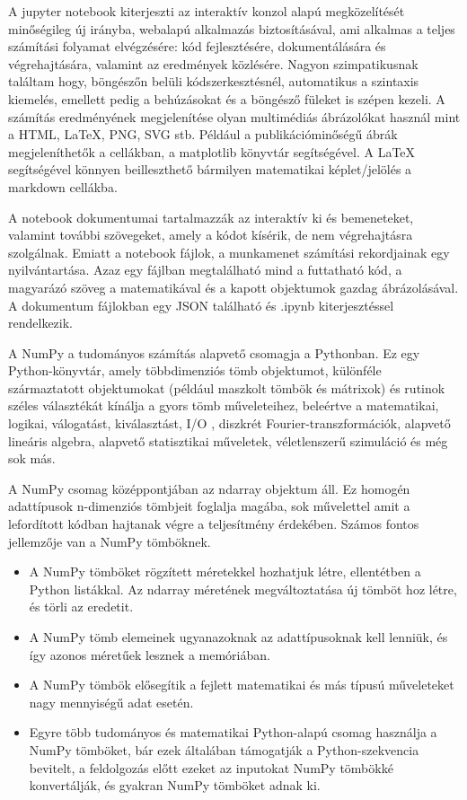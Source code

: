 
A jupyter notebook kiterjeszti az interaktív konzol alapú megközelítését minőségileg új irányba, webalapú alkalmazás biztosításával, ami alkalmas a teljes számítási folyamat elvégzésére: kód fejlesztésére, dokumentálására és végrehajtására, valamint az eredmények közlésére.
Nagyon szimpatikusnak találtam hogy, böngészőn belüli kódszerkesztésnél, automatikus a szintaxis kiemelés, emellett pedig a behúzásokat és a böngésző füleket is szépen kezeli.
A számítás eredményének megjelenítése olyan multimédiás ábrázolókat használ mint a HTML, LaTeX, PNG, SVG stb. Például a publikációminőségű ábrák megjeleníthetők a cellákban, a matplotlib könyvtár segítségével. A LaTeX segítségével könnyen beilleszthető bármilyen matematikai képlet/jelölés a markdown cellákba.

 A notebook dokumentumai tartalmazzák az interaktív ki és bemeneteket, valamint további szövegeket, amely a kódot kísérik, de nem végrehajtásra szolgálnak. 
Emiatt a notebook fájlok, a munkamenet számítási rekordjainak egy nyilvántartása. Azaz egy fájlban megtalálható mind a futtatható kód, a magyarázó szöveg a matematikával és a kapott objektumok gazdag ábrázolásával. A dokumentum fájlokban egy JSON található és .ipynb kiterjesztéssel rendelkezik.


A NumPy a tudományos számítás alapvető csomagja a Pythonban.
Ez egy Python-könyvtár, amely többdimenziós tömb objektumot, különféle származtatott objektumokat (például maszkolt tömbök és mátrixok) és rutinok széles választékát kínálja a gyors tömb műveleteihez, beleértve a matematikai, logikai, válogatást, kiválasztást, I/O , diszkrét Fourier-transzformációk, alapvető lineáris algebra, alapvető statisztikai műveletek, véletlenszerű szimuláció és még sok más.

A NumPy csomag középpontjában az ndarray objektum áll. Ez homogén adattípusok n-dimenziós tömbjeit foglalja magába, sok művelettel amit a lefordított kódban hajtanak végre a teljesítmény érdekében.
Számos fontos jellemzője van a NumPy tömböknek.
\begin{itemize}
\item A NumPy tömböket rögzített méretekkel hozhatjuk létre, ellentétben a Python listákkal.
Az ndarray méretének megváltoztatása új tömböt hoz létre, és törli az eredetit.
\item A NumPy tömb elemeinek ugyanazoknak az adattípusoknak kell lenniük, és így azonos méretűek lesznek a memóriában.
\item A NumPy tömbök elősegítik a fejlett matematikai és más típusú műveleteket nagy mennyiségű adat esetén.
\item Egyre több tudományos és matematikai Python-alapú csomag használja a NumPy tömböket, bár ezek általában támogatják a Python-szekvencia bevitelt, a feldolgozás előtt ezeket az inputokat NumPy tömbökké konvertálják, és gyakran NumPy tömböket adnak ki.
\end{itemize}

